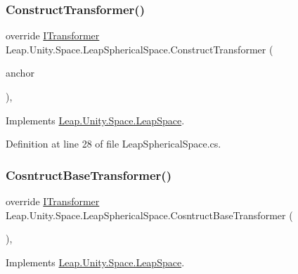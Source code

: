 \subsubsection{\texorpdfstring{ConstructTransformer()}{ConstructTransformer()}}
{\footnotesize\ttfamily override \mbox{\hyperlink{interface_leap_1_1_unity_1_1_space_1_1_i_transformer}{I\+Transformer}} Leap.\+Unity.\+Space.\+Leap\+Spherical\+Space.\+Construct\+Transformer (\begin{DoxyParamCaption}\item[{\mbox{\hyperlink{class_leap_1_1_unity_1_1_space_1_1_leap_space_anchor}{Leap\+Space\+Anchor}}}]{anchor }\end{DoxyParamCaption})\hspace{0.3cm}{\ttfamily [protected]}, {\ttfamily [virtual]}}



Implements \mbox{\hyperlink{class_leap_1_1_unity_1_1_space_1_1_leap_space_af6ff18ae47b473989e65d321da089948}{Leap.\+Unity.\+Space.\+Leap\+Space}}.



Definition at line 28 of file Leap\+Spherical\+Space.\+cs.

\mbox{\label{class_leap_1_1_unity_1_1_space_1_1_leap_spherical_space_af44aeded1cf4e35a2e780a6caa02b674}} 
\subsubsection{\texorpdfstring{CosntructBaseTransformer()}{CosntructBaseTransformer()}}
{\footnotesize\ttfamily override \mbox{\hyperlink{interface_leap_1_1_unity_1_1_space_1_1_i_transformer}{I\+Transformer}} Leap.\+Unity.\+Space.\+Leap\+Spherical\+Space.\+Cosntruct\+Base\+Transformer (\begin{DoxyParamCaption}{ }\end{DoxyParamCaption})\hspace{0.3cm}{\ttfamily [protected]}, {\ttfamily [virtual]}}



Implements \mbox{\hyperlink{class_leap_1_1_unity_1_1_space_1_1_leap_space_a344e65e7be98cd41ba6c6804b283f681}{Leap.\+Unity.\+Space.\+Leap\+Space}}.



